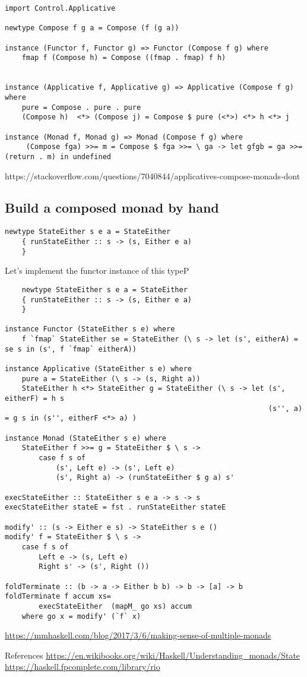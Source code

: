 \begin{verbatim}
import Control.Applicative

newtype Compose f g a = Compose (f (g a))

instance (Functor f, Functor g) => Functor (Compose f g) where
    fmap f (Compose h) = Compose ((fmap . fmap) f h)


instance (Applicative f, Applicative g) => Applicative (Compose f g) where
    pure = Compose . pure . pure
    (Compose h)  <*> (Compose j) = Compose $ pure (<*>) <*> h <*> j

instance (Monad f, Monad g) => Monad (Compose f g) where
     (Compose fga) >>= m = Compose $ fga >>= \ ga -> let gfgb = ga >>= (return . m) in undefined
\end{verbatim}

https://stackoverflow.com/questions/7040844/applicatives-compose-monads-dont


\subsection{Build a composed monad by hand}


\begin{verbatim}
newtype StateEither s e a = StateEither
    { runStateEither :: s -> (s, Either e a)
    }
\end{verbatim}

Let's implement the functor instance of this typeP

\begin{verbatim}
    newtype StateEither s e a = StateEither
    { runStateEither :: s -> (s, Either e a)
    }

instance Functor (StateEither s e) where
    f `fmap` StateEither se = StateEither (\ s -> let (s', eitherA) = se s in (s', f `fmap` eitherA))

instance Applicative (StateEither s e) where
    pure a = StateEither (\ s -> (s, Right a))
    StateEither h <*> StateEither g = StateEither (\ s -> let (s', eitherF) = h s
                                                              (s'', a)      = g s in (s'', eitherF <*> a) )

instance Monad (StateEither s e) where
    StateEither f >>= g = StateEither $ \ s ->
        case f s of
            (s', Left e) -> (s', Left e)
            (s', Right a) -> (runStateEither $ g a) s'

execStateEither :: StateEither s e a -> s -> s
execStateEither stateE = fst . runStateEither stateE

modify' :: (s -> Either e s) -> StateEither s e ()
modify' f = StateEither $ \ s ->
    case f s of
        Left e -> (s, Left e)
        Right s' -> (s', Right ())

foldTerminate :: (b -> a -> Either b b) -> b -> [a] -> b
foldTerminate f accum xs=
        execStateEither  (mapM_ go xs) accum
    where go x = modify' (`f` x)
\end{verbatim}

\url{https://mmhaskell.com/blog/2017/3/6/making-sense-of-multiple-monads}

 References
 \url{https://en.wikibooks.org/wiki/Haskell/Understanding_monads/State}
 \url{https://haskell.fpcomplete.com/library/rio}
